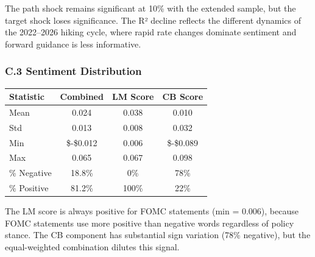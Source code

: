 \documentclass[12pt]{article}
\begin{document}
The path shock remains significant at 10\% with the extended sample, but
the target shock loses significance. The R² decline reflects the
different dynamics of the 2022--2026 hiking cycle, where rapid rate
changes dominate sentiment and forward guidance is less informative.

\subsubsection{C.3 Sentiment
Distribution}\label{c.3-sentiment-distribution}

\begin{longtable}[]{@{}lccc@{}}
\toprule\noalign{}
Statistic & Combined & LM Score & CB Score \\
\midrule\noalign{}
\endhead
\bottomrule\noalign{}
\endlastfoot
Mean & 0.024 & 0.038 & 0.010 \\
Std & 0.013 & 0.008 & 0.032 \\
Min & \$-\$0.012 & 0.006 & \$-\$0.089 \\
Max & 0.065 & 0.067 & 0.098 \\
\% Negative & 18.8\% & 0\% & 78\% \\
\% Positive & 81.2\% & 100\% & 22\% \\
\end{longtable}

The LM score is always positive for FOMC statements (min = 0.006),
because FOMC statements use more positive than negative words regardless
of policy stance. The CB component has substantial sign variation (78\%
negative), but the equal-weighted combination dilutes this signal.
\end{document}
